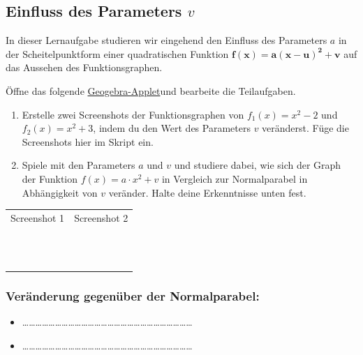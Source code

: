 \documentclass[11pt,oneside]{article}
\begin{document}
\subsection{Einfluss des Parameters $v$}
	In dieser Lernaufgabe studieren wir eingehend den Einfluss des Parameters $a$ in der Scheitelpunktform einer quadratischen Funktion $\mathbf{f(x)=a(x-u)^2+v}$ auf das Aussehen des Funktionsgraphen.
	\begin{aufgabe}
		Öffne das folgende \href{https://www.geogebra.org/m/vtjaqq6u}{Geogebra-Applet}\footnotemark\:und bearbeite die Teilaufgaben.
		\begin{enumerate}[label=\alph*)]
			\item Erstelle zwei Screenshots der Funktionsgraphen von $f_1(x)=x^2-2$ und $f_2(x)=x^2+3$, indem du den Wert des Parameters $v$ veränderst. Füge die Screenshots hier im Skript ein.
			\item Spiele mit den Parameters $a$ und $v$ und studiere dabei, wie sich der Graph der Funktion $f(x)=a\cdot x^2+v$ in Vergleich zur Normalparabel in Abhängigkeit von $v$ veränder. Halte deine Erkenntnisse unten fest.
		\end{enumerate}
	\end{aufgabe}
	\vspace{0.5cm}
	\begin{table}[H]
		\centering
		\begin{tabular}{|p{7.8cm}|p{7.8cm}|}\hline
			Screenshot 1& Screenshot 2\\
			& \\
			& \\
			& \\
			& \\
			& \\
			& \\
			& \\
			& \\
			& \\
			& \\
			& \\
			& \\ \hline
		\end{tabular}
	\end{table}
	\vspace{0.5cm}

\subsubsection*{Veränderung gegenüber der Normalparabel:}
	\begin{itemize}
		\item \ldots\ldots\ldots\ldots\ldots\ldots\ldots\ldots\ldots\ldots\ldots\ldots\ldots\ldots\ldots\ldots\ldots\ldots\ldots\ldots\ldots\ldots\ldots\ldots\ldots\ldots
		\item \ldots\ldots\ldots\ldots\ldots\ldots\ldots\ldots\ldots\ldots\ldots\ldots\ldots\ldots\ldots\ldots\ldots\ldots\ldots\ldots\ldots\ldots\ldots\ldots\ldots\ldots
	\end{itemize}
	\newpage
\end{document}
